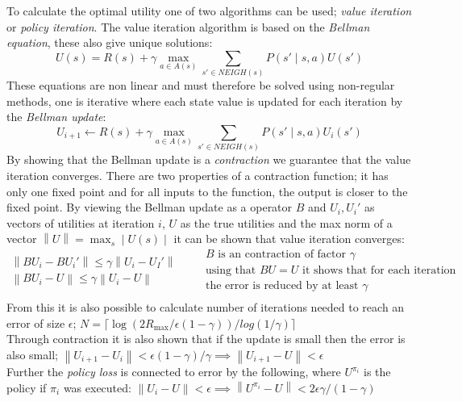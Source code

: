 \documentclass[11pt, letterpaper]{report}
\numberwithin{equation}{section}
\newcommand{\norm}[1]{\left\lVert#1\right\rVert}
\begin{document}
To calculate the optimal utility one of two algorithms can be used; \emph{value
  iteration} or \emph{policy iteration}. The value iteration algorithm is based
on the \emph{Bellman equation}, these also give unique solutions:
\begin{equation}
  \label{eq:bellmaneq}
  U(s) = R(s) + \gamma \max_{a \in A(s)} \sum_{s' \in NEIGH(s)} P(s' \mid s,a)U(s')
\end{equation}
These equations are non linear and must therefore be solved using non-regular
methods, one is iterative where each state value is updated for each iteration
by the \emph{Bellman update}:
\begin{equation}
  \label{eq:bellmanupdate}
  U_{i+1} \leftarrow R(s) + \gamma \max_{a \in A(s)} \sum_{s' \in NEIGH(s)} P(s' \mid s,a)U_i(s')
\end{equation}
By showing that the Bellman update is a \emph{contraction} we guarantee that the
value iteration converges. There are two properties of a contraction function;
it has only one fixed point and for all inputs to the function, the output is
closer to the fixed point. By viewing the Bellman update as a operator $B$ and
$U_i, U_i'$ as vectors of utilities at iteration $i$, $U$ as the true utilities and the max norm of a vector
$\norm{U} = \max_s \mid U(s) \mid$ it can be shown that value
iteration converges:
\begin{equation}
  \label{eq:contration}
  \begin{split}
    \norm{BU_i - BU_i'} \leq \gamma \norm{U_i - U_I'} \\
    \norm{BU_i - U} \leq \gamma \norm{U_i - U} \\
  \end{split}
  \quad
  \begin{split}
    &\text{$B$ is an contraction of factor $\gamma$} \\
    &\text{using that $BU = U$ it shows that for each iteration} \\
    &\text{the error is reduced by at least $\gamma$} \\
  \end{split}
\end{equation}
From this it is also possible to calculate number of iterations needed to reach
an error of size $\epsilon$; $N = \lceil {\log (2R_{\max}/\epsilon
  (1-\gamma))/log(1/\gamma)} \rceil $ \\
Through contraction it is also shown that if the update is small then the
error is also small; $\norm{U_{i+1}-U_i} < \epsilon(1-\gamma)/\gamma \implies
  \norm{U_{i+1} - U} < \epsilon $ \\
Further the \emph{policy loss} is connected to error by the following, where
$U^{\pi_i}$ is the policy if $\pi_i$ was executed:
$\norm{U_i-U} < \epsilon \implies \norm{U^{\pi_i}-U} < 2\epsilon\gamma/(1-\gamma)$
\end{document}
